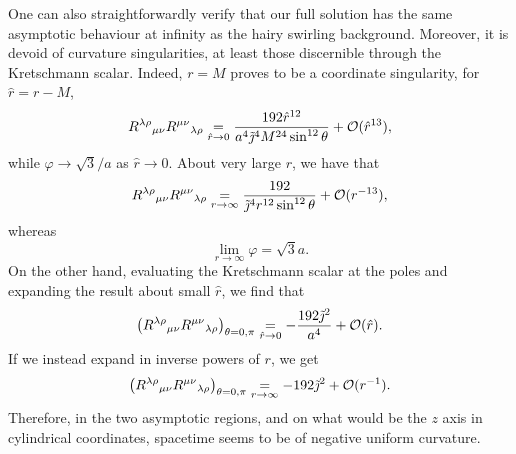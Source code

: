\documentclass[aps,preprint,groupedaddress,nofootinbib,superscriptaddress,showkeys,showpacs,eqsecnum,amsmath,amssymb]{revtex4-1}
\begin{document}
One can also straightforwardly verify that our full solution has the same asymptotic behaviour at infinity as the hairy swirling background. Moreover, it is devoid of curvature singularities, at least those discernible through the Kretschmann scalar. Indeed, $r=M$ proves to be a coordinate singularity, for $\hat{r}=r-M$, 
\begin{equation}
    R^{\lambda\rho}{}_{\mu\nu}R^{\mu\nu}{}_{\lambda\rho} \underset{\hat{r}\to 0}{=} \frac{192\hat{r}^{12}}{a^4\Tilde{\jmath}^4 M^{24}\sin^{12}\theta} +\mathcal{O}(\hat{r}^{13}) ,\label{eq:KretschM}
\end{equation}
while $\varphi \to \sqrt{3}/a$ as $\hat{r}\to 0$. About very large $r$, we have that 
\begin{equation}
    R^{\lambda\rho}{}_{\mu\nu}R^{\mu\nu}{}_{\lambda\rho} \underset{r\to \infty}{=} \frac{192}{\Tilde{\jmath}^4 r^{12} \sin^{12}\theta }+\mathcal{O}(r^{-13}),\label{eq:KretschInf}
\end{equation}
whereas 
\begin{equation}
    \lim\limits_{r\to \infty}\varphi = \sqrt{3}a.
\end{equation}
On the other hand, evaluating the Kretschmann scalar at the poles and expanding the result about small $\hat{r}$, we find that 
\begin{equation}
    \left(R^{\lambda\rho}{}_{\mu\nu}R^{\mu\nu}{}_{\lambda\rho}\right)_{\theta=0,\pi}\underset{\hat{r}\to 0}{=}-\frac{192 \Tilde{\jmath}^2}{a^4}+\mathcal{O}(\hat{r}).
\end{equation}
If we instead expand in inverse powers of $r$, we get 
\begin{equation}
    \left(R^{\lambda\rho}{}_{\mu\nu}R^{\mu\nu}{}_{\lambda\rho}\right)_{\theta=0,\pi}\underset{{r}\to \infty}{=}-192 \Tilde{\jmath}^2+\mathcal{O}(r^{-1}).
\end{equation}
Therefore, in the two asymptotic regions, and on what would be the $z$ axis in cylindrical coordinates, spacetime seems to be of negative uniform curvature. 
\end{document}

